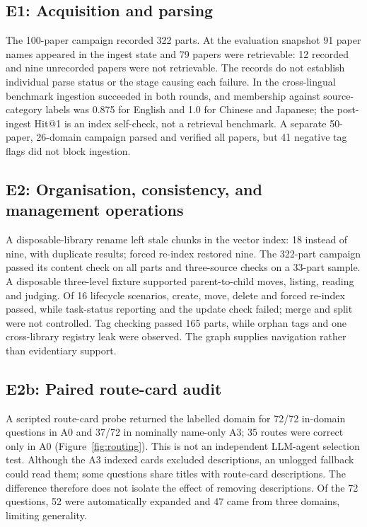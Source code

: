 \subsection{E1: Acquisition and parsing}
\label{sec:e1}
The 100-paper campaign recorded 322 parts. At the evaluation snapshot 91
paper names appeared in the ingest state and 79 papers were retrievable:
12 recorded and nine unrecorded papers were not retrievable. The records do
not establish individual parse status or the stage causing each failure. In
the cross-lingual benchmark ingestion succeeded in both rounds, and
membership against source-category labels was 0.875 for English and 1.0 for
Chinese and Japanese; the post-ingest Hit@1 is an index self-check, not a
retrieval benchmark. A separate 50-paper, 26-domain campaign parsed and
verified all papers, but 41 negative tag flags did not block ingestion.

\subsection{E2: Organisation, consistency, and management operations}
\label{sec:e2}
A disposable-library rename left stale chunks in the vector index: 18 instead
of nine, with duplicate results; forced re-index restored nine. The 322-part
campaign passed its content check on all parts and three-source checks on a
33-part sample. A disposable three-level fixture supported parent-to-child
moves, listing, reading and judging. Of 16 lifecycle scenarios, create, move,
delete and forced re-index passed, while task-status reporting and the update
check failed; merge and split were not controlled. Tag checking passed 165
parts, while orphan tags and one cross-library registry leak were observed.
The graph supplies navigation rather than evidentiary support.

\subsection{E2b: Paired route-card audit}
\label{sec:routing-audit}
A scripted route-card probe returned the labelled domain for 72/72 in-domain
questions in A0 and 37/72 in nominally name-only A3; 35 routes were correct
only in A0 (Figure~\ref{fig:routing}). This is not an independent LLM-agent
selection test. Although the A3 indexed cards excluded descriptions, an
unlogged fallback could read them; some questions share titles with route-card
descriptions. The difference therefore does not isolate the effect of
removing descriptions. Of the 72 questions, 52 were automatically expanded
and 47 came from three domains, limiting generality.

